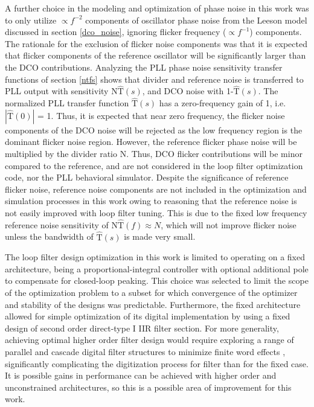 A further choice in the modeling and optimization of phase noise in this work was to only utilize $\propto f^{-2}$ components of oscillator phase noise from the Leeson model discussed in section \ref{dco_noise}, ignoring flicker frequency ($\propto f^{-1}$) components. The rationale for the exclusion of flicker noise components was that it is expected that flicker components of the reference oscillator will be significantly larger than the DCO contributions. Analyzing the PLL phase noise sensitivity transfer functions of section \ref{ntfs} shows that divider and reference noise is transferred to PLL output with sensitivity N$\hat{\mathrm{T}}(s)$, and DCO noise with 1-$\hat{\mathrm{T}}(s)$. The normalized PLL transfer function $\hat{\mathrm{T}}(s)$ has a zero-frequency gain of 1, i.e. $|\hat{\mathrm{T}}(0)|$ = 1. Thus, it is expected that near zero frequency, the flicker noise components of the DCO noise will be rejected as the low frequency region is the dominant flicker noise region. However, the reference flicker phase noise will be multiplied by the divider ratio N. Thus, DCO flicker contributions will be minor compared to the reference, and are not considered in the loop filter optimization code, nor the PLL behavioral simulator. Despite the significance of reference flicker noise, reference noise components are not included in the optimization and simulation processes in this work owing to reasoning that the reference noise is not easily improved with loop filter tuning. This is due to the fixed low frequency reference noise sensitivity of N$\hat{\mathrm{T}}(f) \approx N$, which will not improve flicker noise unless the bandwidth of $\hat{\mathrm{T}}(s)$ is made very small.

The loop filter design optimization in this work is limited to operating on a fixed architecture, being a proportional-integral controller with optional additional pole to compensate for closed-loop peaking. This choice was selected to limit the scope of the optimization problem to a subset for which convergence of the optimizer and stability of the designs was predictable. Furthermore, the fixed architecture allowed for simple optimization of its digital implementation by using a fixed design of second order direct-type I IIR filter section. For more generality, achieving optimal higher order filter design would require exploring a range of parallel and cascade digital filter structures to minimize finite word effects \cite{proakis_1993_x}, significantly complicating the digitization process for filter than for the fixed case. It is possible gains in performance can be achieved with higher order and unconstrained architectures, so this is a possible area of improvement for this work.

